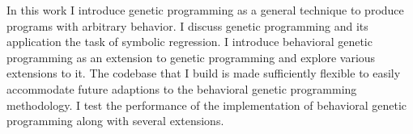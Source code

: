 % 
% 
%

In this work I introduce genetic programming as a general technique to produce programs with arbitrary behavior.  I discuss genetic programming and its application the task of symbolic regression.  I introduce behavioral genetic programming as an extension to genetic programming and explore various extensions to it.  The codebase that I build is made sufficiently flexible to easily accommodate future adaptions to the behavioral genetic programming methodology.  I test the performance of the implementation of behavioral genetic programming along with several extensions.